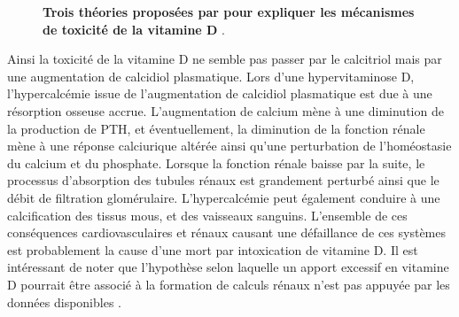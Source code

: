 \documentclass[
  a4paper,
  DIV=11,
  numbers=noendperiod,
  listof=totoc]{scrreprt}
\begin{document}
\begin{figure}


\caption[Trois théories proposées par \textcite{Jones.2008} pour
expliquer les mécanismes de toxicité de la vitamine
D.]{\label{fig-vd-intox-theory}\textbf{Trois théories proposées par
\textcite{Jones.2008} pour expliquer les mécanismes de toxicité de la
vitamine D} \autocite{Janoušek.2022}.}

\end{figure}%

Ainsi la toxicité de la vitamine D ne semble pas passer par le
calcitriol mais par une augmentation de calcidiol plasmatique. Lors
d'une hypervitaminose D, l'hypercalcémie issue de l'augmentation de
calcidiol plasmatique est due à une résorption osseuse accrue.
L'augmentation de calcium mène à une diminution de la production de
\ac{PTH}, et éventuellement, la diminution de la fonction rénale mène à
une réponse calciurique altérée ainsi qu'une perturbation de
l'homéostasie du calcium et du phosphate. Lorsque la fonction rénale
baisse par la suite, le processus d'absorption des tubules rénaux est
grandement perturbé ainsi que le débit de filtration glomérulaire.
L'hypercalcémie peut également conduire à une calcification des tissus
mous, et des vaisseaux sanguins. L'ensemble de ces conséquences
cardiovasculaires et rénaux causant une défaillance de ces systèmes est
probablement la cause d'une mort par intoxication de vitamine D. Il est
intéressant de noter que l'hypothèse selon laquelle un apport excessif
en vitamine D pourrait être associé à la formation de calculs rénaux
n'est pas appuyée par les données disponibles \autocite{IOM.2011}.
\end{document}
